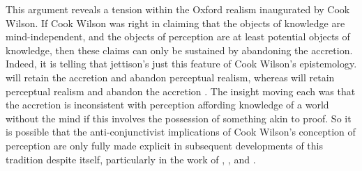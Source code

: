 \documentclass[12pt]{article}
\begin{document}
This argument reveals a tension within the Oxford realism inaugurated by Cook Wilson. If Cook Wilson was right in claiming that the objects of knowledge are mind-independent, and the objects of perception are at least potential objects of knowledge, then these claims can only be sustained by abandoning the accretion. Indeed, it is telling that \citet{Austin:1962lr} jettison's just this feature of Cook Wilson's epistemology. \citet{Prichard:1938ve} will retain the accretion and abandon perceptual realism, whereas \citet{Austin:1962lr} will retain perceptual realism and abandon the accretion \citep[see][for discussion]{Kalderon:2010fk}. The insight moving each was that the accretion is inconsistent with perception affording knowledge of a world without the mind if this involves the possession of something akin to proof. So it is possible that the anti-conjunctivist implications of Cook Wilson's conception of perception are only fully made explicit in subsequent developments of this tradition despite itself, particularly in the work of \citet{Prichard:1938ve}, \citet{Austin:1962lr}, and \cite{Hinton:1973js}.


\nocite{Hobbes:1651fk}

 
 
\end{document}
